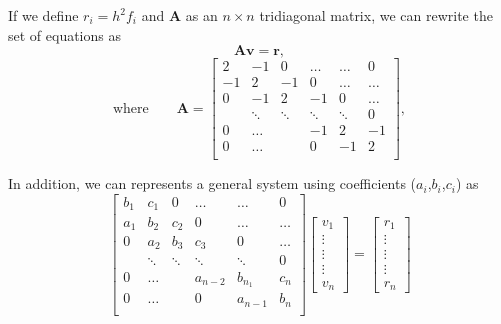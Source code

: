 \documentclass[10pt,showpacs,preprintnumbers,footinbib,amsmath,amssymb,aps,prl,twocolumn,groupedaddress,superscriptaddress,showkeys]{revtex4-1}
\begin{document}
If we define $r_i=h^2f_i$ and $\mathbf{A}$ as an $n\times n$ tridiagonal matrix, we can rewrite the set of equations as 
\begin{equation*}
\mathbf{A}\mathbf{v} = \mathbf{r},
\end{equation*}
\begin{equation}
\text{where}\qquad
\label{A}
\mathbf{A} = \begin{bmatrix}
2& -1& 0 &\dots   & \dots &0 \\
-1 & 2 & -1 &0 &\dots &\dots \\
0&-1 &2 & -1 & 0 & \dots \\
& \ddots   & \ddots &\ddots   &\ddots & 0 \\
0&\dots   &  &-1 &2& -1 \\
0&\dots    &  & 0  &-1 & 2 \\
\end{bmatrix},
\end{equation}

In addition, we can represents a general system using coefficients ($a_i$,$b_i$,$c_i$) as
\begin{equation}
\begin{bmatrix}
b_1& c_1& 0 &\dots   & \dots &0 \\
a_1 & b_2 & c_2 &0 &\dots &\dots \\
0&a_2 & b_3 & c_3 & 0 & \dots \\
& \ddots   & \ddots &\ddots   &\ddots & 0 \\
0&\dots   &  &a_{n-2} &b_{n_1}& c_n \\
0&\dots    &  & 0  &a_{n-1} & b_n \\
\end{bmatrix}\left[\begin{array}{c}
v_1 \\
\vdots \\
\vdots \\
\vdots \\
v_n
\end{array}\right]=\left[\begin{array}{c}
r_1 \\
\vdots \\
\vdots \\
\vdots \\
r_n
\end{array}\right]
\end{equation} 
\end{document}

